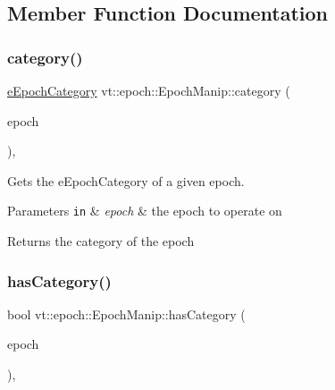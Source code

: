 \subsection{Member Function Documentation}
\mbox{\label{structvt_1_1epoch_1_1_epoch_manip_aa61d47033545df147c01036211c4cabe}} 
\subsubsection{\texorpdfstring{category()}{category()}}
{\footnotesize\ttfamily \hyperlink{namespacevt_1_1epoch_a956abe0aceef0d10a988de8acb002c7c}{e\+Epoch\+Category} vt\+::epoch\+::\+Epoch\+Manip\+::category (\begin{DoxyParamCaption}\item[{\hyperlink{namespacevt_a985a5adf291c34a3ca263b3378388236}{Epoch\+Type} const \&}]{epoch }\end{DoxyParamCaption})\hspace{0.3cm}{\ttfamily [inline]}, {\ttfamily [static]}}



Gets the {\ttfamily e\+Epoch\+Category} of a given epoch. 


\begin{DoxyParams}[1]{Parameters}
\mbox{\tt in}  & {\em epoch} & the epoch to operate on\\
\hline
\end{DoxyParams}
\begin{DoxyReturn}{Returns}
the category of the {\ttfamily epoch} 
\end{DoxyReturn}
\mbox{\label{structvt_1_1epoch_1_1_epoch_manip_a57a6313d8f4ffc685ee47b2a881079ac}} 
\subsubsection{\texorpdfstring{has\+Category()}{hasCategory()}}
{\footnotesize\ttfamily bool vt\+::epoch\+::\+Epoch\+Manip\+::has\+Category (\begin{DoxyParamCaption}\item[{\hyperlink{namespacevt_a985a5adf291c34a3ca263b3378388236}{Epoch\+Type} const \&}]{epoch }\end{DoxyParamCaption})\hspace{0.3cm}{\ttfamily [inline]}, {\ttfamily [static]}}




